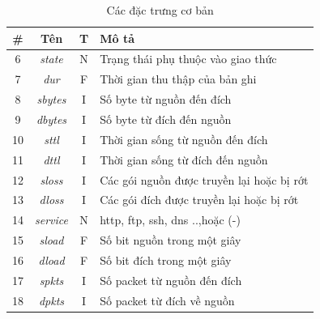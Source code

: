 \begin{table}[H]
    \centering
    \begin{tabular}{|c|c|c|l|}
        \hline
        \textbf{\#}  & \textbf{Tên} & \textbf{T} & \textbf{Mô tả} \\
        \hline
        6 & \textit{state} & N & Trạng thái phụ thuộc vào giao thức \\
        \hline
        7 & \textit{dur} & F & Thời gian thu thập của bản ghi\\
        \hline
        8 & \textit{sbytes} & I & Số byte từ nguồn đến đích\\
        \hline
        9 & \textit{dbytes} & I & Số byte từ đích đến nguồn \\
        \hline
        10 & \textit{sttl} & I &  Thời gian sống từ nguồn đến đích\\
        \hline
        11 & \textit{dttl} & I &  Thời gian sống từ đích đến nguồn\\
        \hline
        12 & \textit{sloss} & I &  Các gói nguồn được truyền lại hoặc bị rớt\\
        \hline
        13 & \textit{dloss} & I &  Các gói đích được truyền lại hoặc bị rớt\\
        \hline
        14 & \textit{service} & N & http, ftp, ssh, dns ..,hoặc (-) \\
        \hline
        15 & \textit{sload} & F & Số bit nguồn trong một giây \\
        \hline
        16 & \textit{dload} & F &  Số bit đích trong một giây\\
        \hline
        17 & \textit{spkts} & I &  Số packet từ nguồn đến đích\\
        \hline
        18 & \textit{dpkts} & I &  Số packet từ đích về nguồn\\
        \hline
    \end{tabular}
    \caption{Các đặc trưng cơ bản}
    
\end{table}

